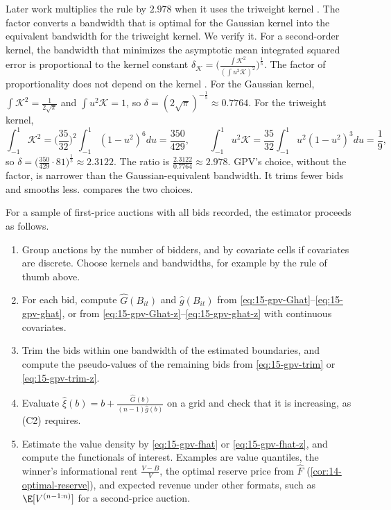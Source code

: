 Later work multiplies the rule by $2.978$ when it uses the triweight kernel \citep{LiPerrigneVuong2002,CampoPerrigneVuong2003,Krasnokutskaya2011}. The factor converts a bandwidth that is optimal for the Gaussian kernel into the equivalent bandwidth for the triweight kernel. We verify it. For a second-order kernel, the bandwidth that minimizes the asymptotic mean integrated squared error is proportional to the kernel constant $\delta_{\mathcal K}=\big(\frac{\int\mathcal K^2}{(\int u^2\mathcal K)^2}\big)^{\frac15}$. The factor of proportionality does not depend on the kernel \citep{Hardle1991}. For the Gaussian kernel, $\int\mathcal K^2=\frac{1}{2\sqrt\pi}$ and $\int u^2\mathcal K=1$, so $\delta=(2\sqrt\pi)^{-\frac15}\approx0.7764$. For the triweight kernel,
\[
\int_{-1}^1\mathcal K^2=\Big(\frac{35}{32}\Big)^2\int_{-1}^1(1-u^2)^6du=\frac{350}{429},\qquad\int_{-1}^1u^2\mathcal K=\frac{35}{32}\int_{-1}^1u^2(1-u^2)^3du=\frac19,
\]
so $\delta=\big(\frac{350}{429}\cdot81\big)^{\frac15}\approx2.3122$. The ratio is $\frac{2.3122}{0.7764}\approx2.978$. GPV's choice, without the factor, is narrower than the Gaussian-equivalent bandwidth. It trims fewer bids and smooths less.  compares the two choices.

 For a sample of first-price auctions with all bids recorded, the estimator proceeds as follows.
\begin{enumerate}
\item Group auctions by the number of bidders, and by covariate cells if covariates are discrete. Choose kernels and bandwidths, for example by the rule of thumb above.
\item For each bid, compute $\hat G(B_{it})$ and $\hat g(B_{it})$ from \eqref{eq:15-gpv-Ghat}--\eqref{eq:15-gpv-ghat}, or from \eqref{eq:15-gpv-Ghat-z}--\eqref{eq:15-gpv-ghat-z} with continuous covariates.
\item Trim the bids within one bandwidth of the estimated boundaries, and compute the pseudo-values of the remaining bids from \eqref{eq:15-gpv-trim} or \eqref{eq:15-gpv-trim-z}.
\item Evaluate $\hat\xi(b)=b+\frac{\hat G(b)}{(n-1)\hat g(b)}$ on a grid and check that it is increasing, as (C2) requires.
\item Estimate the value density by \eqref{eq:15-gpv-fhat} or \eqref{eq:15-gpv-fhat-z}, and compute the functionals of interest. Examples are value quantiles, the winner's informational rent $\frac{V-B}{V}$, the optimal reserve price from $\hat F$ (\cref{cor:14-optimal-reserve}), and expected revenue under other formats, such as $\E[V^{(n-1:n)}]$ for a second-price auction.
\end{enumerate}

